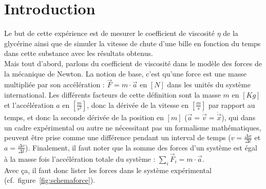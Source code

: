 \section{Introduction}\label{sec:introduction}
Le but de cette expérience est de mesurer le coefficient de viscosité $\eta$ de la glycérine
ainsi que de simuler la vitesse de chute d'une bille en fonction du temps dans cette substance
avec les résultats obtenus. \\
Mais tout d'abord, parlons du coefficient de viscosité dans le modèle des forces de la mécanique
de Newton.
La notion de base, c'est qu'une force est une masse multipliée par son accélération :
$\vec{F} = m \cdot \vec{a}$ en $[N]$ dans les unités du système international.
Les différents facteurs de cette définition sont la masse $m$ en $[Kg]$ et l'accélération $a$ en
$\left[\frac{m}{s^{2}}  \right]$, donc la dérivée de la vitesse en $\left[\frac{m}{s}  \right]$
par rapport au temps, et donc la seconde dérivée de la position en $[m]$
($\vec{a} = \dot{\vec{v}} = \ddot{\vec{x}} $), qui dans un cadre expérimental ou autre
ne nécessitant pas un formalisme mathématiques, peuvent être prise comme une
différence pendant un interval de temps ($ v=\frac{\Delta x}{\Delta t} $
et $a = \frac{\Delta v}{\Delta t} $).
Finalement, il faut noter que la somme des forces d'un système est égal à la masse fois l'accélération
totale du système : $\sum\limits_{i}{\vec{F}_{i}} = m \cdot \vec{a}$. \\
Avec ça, il faut donc lister les forces dans le système expérimental (cf.\ figure~\ref{fig:schemaforce}). \\
